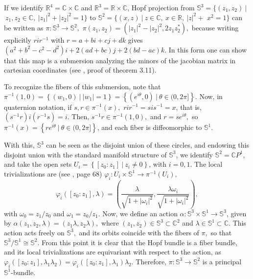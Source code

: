 \documentclass[12pt, letterpaper, reqno]{amsart}
\theoremstyle{definition}
\theoremstyle{plain}
\theoremstyle{remark}
\begin{document}
	If we identify $ \mathbb{R}^4=\mathbb{C}\times \mathbb{C} $ and $ \mathbb{R}^3= \mathbb{R}\times\mathbb{C}  $, Hopf projection from $ \mathbb{S}^3= \{ (z_1,z_2)\  |$ $ \ z_1,z_2\in \mathbb{C}, \ |z_1|^2+|z_2|^2=1 \} $ to $ \mathbb{S}^2 = \{ (x,z)\ | \ z\in \mathbb{C},\ x\in \mathbb{R},\ |z|^2+$ $x^2=1 \} $  can be written as $ \pi: \mathbb{S}^3 \rightarrow { \mathbb{S}^2},$ $ \pi(z_1,z_2) =(|z_1|^2-|z_2|^2, 2z_1z_2^* ),$ because writing explicitly $ rir^{-1} $ with $ r=a+bi+cj+dk $ gives $ (a^2+b^2-c^2-d^2)i+2(ad+bc)j+2(bd-ac)k. $    In this form one can show that this map is a submersion analyzing the minors of the jacobian matrix in cartesian coordinates (see \cite{linintroductory}, proof of theorem 3.11).

	To recognize the fibers of this submersion, note that $ \pi^{-1}(1,0) = \left\{ (w_1,0) \ | \ |w_1| =1 \right\} = \left\{ (e^{i\theta},0) \ | \ \theta\in (0,2\pi]  \right\} $. Now, in quaternion notation, if $ s,r\in \pi^{-1}(x), $ $ rir^{-1} = sis^{-1}=x $, that is, $ (s^{-1}r)i(r^{-1}s) = i $. Then, $ s^{-1}r \in \pi^{-1}(1,0), $ and $ r= se^{i\theta}, $ so $ \pi^{-1}(x) = \left\{ re^{i\theta}\ | \ \theta\in (0,2\pi] \right\} $, and each fiber is diffeomorphic to $ \mathbb{S}^1. $        

	With this, $ \mathbb{S}^3 $ can be seen as the disjoint union of these circles, and endowing this disjoint union with the standard manifold structure of $ \mathbb{S}^3 $, we identify $ \mathbb{S}^2 = \mathbb{C}P^1$, and take the open sets $ U_i= \left\{ \left[ z_0 : z_1 \right]\ | \ z_i\neq 0 \right\}$, with $ i=0,1. $ The local trivializations are (see \cite{luke2013vector}, page 68) $ \varphi_i: U_i \times \mathbb{S}^1 \rightarrow \pi^{-1}(U_i), $ $$ \varphi_i([z_0:z_1], \lambda) = \left( \frac{\lambda}{\sqrt{1+|\omega_i|^2}}, \frac{\lambda\omega_i}{\sqrt{1+|\omega_i|^2}}   \right), $$ with $ \omega_0=z_1/z_0 $ and $ \omega_1 = z_0/z_1. $ Now, we define an action $ \alpha: \mathbb{S}^3\times \mathbb{S}^1 \rightarrow { \mathbb{S}^3}
	$, given by $ \alpha(z_1,z_2,\lambda) = (z_1\lambda, z_2\lambda), $ where $ (z_1,z_2)\in \mathbb{S}^3\subset \mathbb{C}^2 $ and $ \lambda\in \mathbb{S}^1 \subset \mathbb{C}. $ This action acts freely on $ \mathbb{S}^3, $ and its orbits coincide with the fibers of $ \pi, $ so that $ \mathbb{S}^3/ \mathbb{S}^1 \cong \mathbb{S}^2. $ From this point it is clear that the Hopf bundle is a fiber bundle, and its local trivializations are equivariant with respect to the action, as $ \varphi_i([z_0:z_1], \lambda_1\lambda_2) = \varphi_i([z_0:z_1], \lambda_1)\lambda_2. $ Therefore, $ \pi: \mathbb{S}^3 \rightarrow { \mathbb{S}^2} $ is a principal $ \mathbb{S}^1$-bundle.
\end{document}
